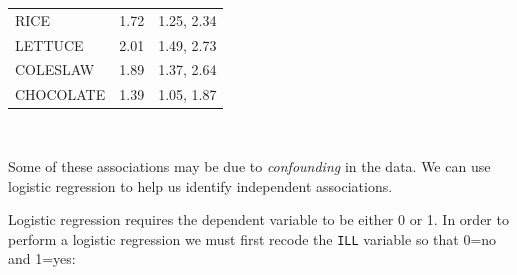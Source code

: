 \documentclass[12pt,a4paper]{book}
\newenvironment{Shaded}{\begin{snugshade}}{\end{snugshade}}
\newcommand{\DecValTok}[1]{\textcolor[rgb]{0.00,0.00,0.81}{#1}}
\newcommand{\KeywordTok}[1]{\textcolor[rgb]{0.13,0.29,0.53}{\textbf{#1}}}
\newcommand{\NormalTok}[1]{#1}
\newcommand{\OperatorTok}[1]{\textcolor[rgb]{0.81,0.36,0.00}{\textbf{#1}}}
\newcommand{\StringTok}[1]{\textcolor[rgb]{0.31,0.60,0.02}{#1}}
\theoremstyle{definition}
\theoremstyle{definition}
\theoremstyle{definition}
\theoremstyle{remark}
\begin{document}
\begin{longtable}[]{@{}lll@{}}
\begin{minipage}[t]{0.20\columnwidth}
RICE\strut
\end{minipage} & \begin{minipage}[t]{0.14\columnwidth}\raggedright
1.72\strut
\end{minipage} & \begin{minipage}[t]{0.27\columnwidth}\raggedright
1.25, 2.34\strut
\end{minipage}\tabularnewline
\begin{minipage}[t]{0.20\columnwidth}\raggedright
LETTUCE\strut
\end{minipage} & \begin{minipage}[t]{0.14\columnwidth}\raggedright
2.01\strut
\end{minipage} & \begin{minipage}[t]{0.27\columnwidth}\raggedright
1.49, 2.73\strut
\end{minipage}\tabularnewline
\begin{minipage}[t]{0.20\columnwidth}\raggedright
COLESLAW\strut
\end{minipage} & \begin{minipage}[t]{0.14\columnwidth}\raggedright
1.89\strut
\end{minipage} & \begin{minipage}[t]{0.27\columnwidth}\raggedright
1.37, 2.64\strut
\end{minipage}\tabularnewline
\begin{minipage}[t]{0.20\columnwidth}\raggedright
CHOCOLATE\strut
\end{minipage} & \begin{minipage}[t]{0.14\columnwidth}\raggedright
1.39\strut
\end{minipage} & \begin{minipage}[t]{0.27\columnwidth}\raggedright
1.05, 1.87\strut
\end{minipage}\tabularnewline
\bottomrule
\end{longtable}

~

Some of these associations may be due to \emph{confounding} in the data.
We can use logistic regression to help us identify independent
associations.

Logistic regression requires the dependent variable to be either 0 or 1.
In order to perform a logistic regression we must first recode the
\texttt{ILL} variable so that 0=no and 1=yes:

~

\begin{Shaded}
\end{Shaded}
\end{document}
